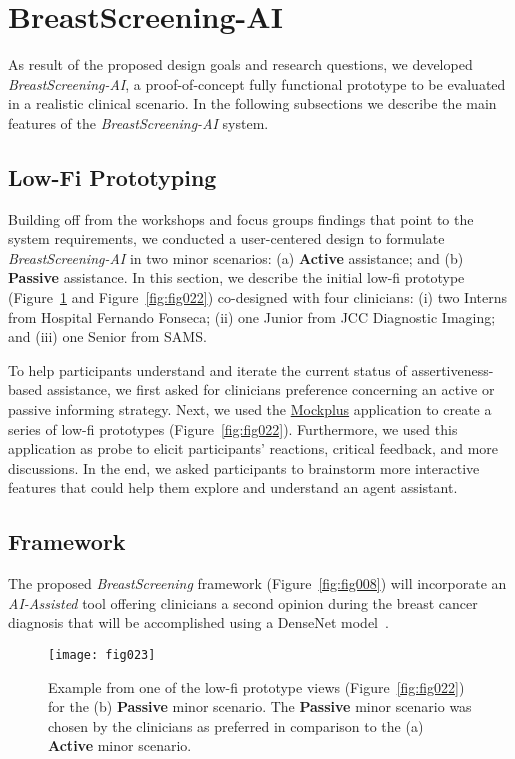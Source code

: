 \section{BreastScreening-AI}
\label{sec:sec006}

As result of the proposed design goals and research questions, we developed {\it BreastScreening-AI}, a proof-of-concept fully functional prototype to be evaluated in a realistic clinical scenario.
In the following subsections we describe the main features of the {\it BreastScreening-AI} system.

\subsection{Low-Fi Prototyping}
\label{sec:sec00601}

Building off from the workshops and focus groups findings that point to the system requirements, we conducted a user-centered design to formulate {\it BreastScreening-AI} in two minor scenarios:
(a) {\bf Active} assistance; and
(b) {\bf Passive} assistance.
In this section, we describe the initial low-fi prototype (Figure~\ref{fig:fig023} and Figure~\ref{fig:fig022}) co-designed with four clinicians:
(i) two Interns from Hospital Fernando Fonseca;
(ii) one Junior from JCC Diagnostic Imaging; and
(iii) one Senior from SAMS.

To help participants understand and iterate the current status of assertiveness-based assistance, we first asked for clinicians preference concerning an active or passive informing strategy.
Next, we used the \hyperlink{https://www.mockplus.com}{Mockplus} application to create a series of low-fi prototypes (Figure~\ref{fig:fig022}).
Furthermore, we used this application as probe to elicit participants' reactions, critical feedback, and more discussions.
In the end, we asked participants to brainstorm more interactive features that could help them explore and understand an agent assistant.

\subsection{Framework}
\label{sec:sec00602}

The proposed {\it BreastScreening} framework (Figure~\ref{fig:fig008}) will incorporate an {\it AI-Assisted} tool offering clinicians a second opinion during the breast cancer diagnosis that will be accomplished using a DenseNet model~\cite{chen2019learning}.

\begin{figure}[htbp]
\centering
\texttt{[image: fig023]}
\caption{Example from one of the low-fi prototype views (Figure~\ref{fig:fig022}) for the (b) {\bf Passive} minor scenario. The {\bf Passive} minor scenario was chosen by the clinicians as preferred in comparison to the (a) {\bf Active} minor scenario.}
\label{fig:fig023}
\end{figure}


